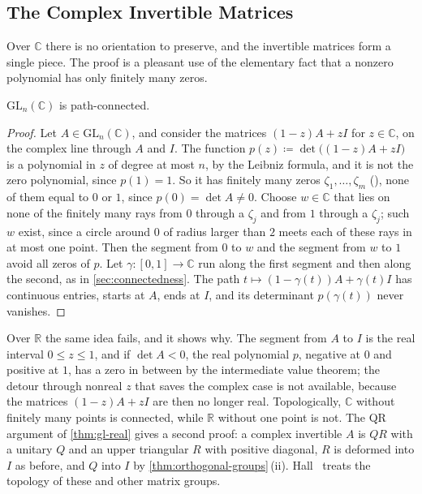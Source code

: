 \subsection{The Complex Invertible Matrices}

Over $\mathbb C$ there is no orientation to preserve, and the invertible matrices form a single piece. The proof is a pleasant use of the elementary fact that a nonzero polynomial has only finitely many zeros.

\begin{theorem}
\label{thm:gl-complex}
$\mathrm{GL}_n(\mathbb C)$ is path-connected.
\end{theorem}

\begin{proof}
Let $A\in\mathrm{GL}_n(\mathbb C)$, and consider the matrices $(1-z)A+zI$ for $z\in\mathbb C$, on the complex line through $A$ and $I$. The function $p(z)\coloneqq\det\bigl((1-z)A+zI\bigr)$ is a polynomial in $z$ of degree at most $n$, by the Leibniz formula, and it is not the zero polynomial, since $p(1)=1$. So it has finitely many zeros $\zeta_1,\ldots,\zeta_m$ (), none of them equal to $0$ or $1$, since $p(0)=\det A\ne0$. Choose $w\in\mathbb C$ that lies on none of the finitely many rays from $0$ through a $\zeta_j$ and from $1$ through a $\zeta_j$; such $w$ exist, since a circle around $0$ of radius larger than $2$ meets each of these rays in at most one point. Then the segment from $0$ to $w$ and the segment from $w$ to $1$ avoid all zeros of $p$. Let $\gamma\colon[0,1]\to\mathbb C$ run along the first segment and then along the second, as in \cref{sec:connectedness}. The path $t\mapsto(1-\gamma(t))A+\gamma(t)I$ has continuous entries, starts at $A$, ends at $I$, and its determinant $p(\gamma(t))$ never vanishes.
\end{proof}

Over $\mathbb R$ the same idea fails, and it shows why. The segment from $A$ to $I$ is the real interval $0\le z\le1$, and if $\det A<0$, the real polynomial $p$, negative at $0$ and positive at $1$, has a zero in between by the intermediate value theorem; the detour through nonreal $z$ that saves the complex case is not available, because the matrices $(1-z)A+zI$ are then no longer real. Topologically, $\mathbb C$ without finitely many points is connected, while $\mathbb R$ without one point is not. The QR argument of \cref{thm:gl-real} gives a second proof: a complex invertible $A$ is $QR$ with a unitary $Q$ and an upper triangular $R$ with positive diagonal, $R$ is deformed into $I$ as before, and $Q$ into $I$ by \cref{thm:orthogonal-groups}\,(ii). Hall~\cite[Sect.~1.3]{hall2015} treats the topology of these and other matrix groups.

